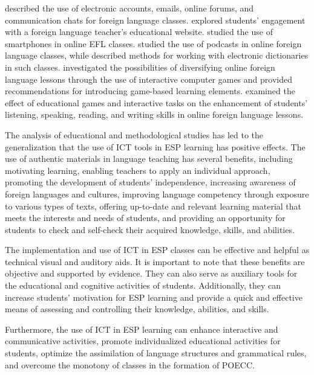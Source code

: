 \textcite{janowska2017mediation} described the use of electronic accounts, emails, online forums, and communication chats for foreign language classes. \textcite{budiman2020ict} explored students’ engagement with a foreign language teacher’s educational website. \textcite{huzairin2020technology} studied the use of smartphones in online EFL classes. \textcite{janowska2017mediation} studied the use of podcasts in online foreign language classes, while \textcite{galan2019modern} described methods for working with electronic dictionaries in such classes. \textcite{nocentini2015anti} investigated the possibilities of diversifying online foreign language lessons through the use of interactive computer games and provided recommendations for introducing game-based learning elements. \textcite{carrio2015collaborative} examined the effect of educational games and interactive tasks on the enhancement of students’ listening, speaking, reading, and writing skills in online foreign language lessons.

The analysis of educational and methodological studies has led to the generalization that the use of ICT tools in ESP learning has positive effects. The use of authentic materials in language teaching has several benefits, including motivating learning, enabling teachers to apply an individual approach, promoting the development of students’ independence, increasing awareness of foreign languages and cultures, improving language competency through exposure to various types of texts, offering up-to-date and relevant learning material that meets the interests and needs of students, and providing an opportunity for students to check and self-check their acquired knowledge, skills, and abilities.

The implementation and use of ICT in ESP classes can be effective and helpful as technical visual and auditory aids. It is important to note that these benefits are objective and supported by evidence. They can also serve as auxiliary tools for the educational and cognitive activities of students. Additionally, they can increase students’ motivation for ESP learning and provide a quick and effective means of assessing and controlling their knowledge, abilities, and skills.

Furthermore, the use of ICT in ESP learning can enhance interactive and communicative activities, promote individualized educational activities for students, optimize the assimilation of language structures and grammatical rules, and overcome the monotony of classes in the formation of POECC.
